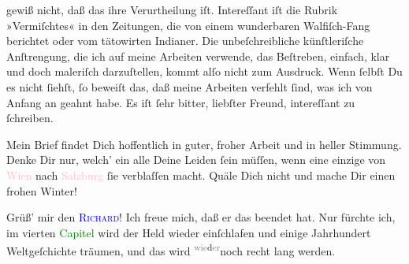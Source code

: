                gewiß nicht, daß das ihre Verurtheilung iſt. Intereſſant iſt die Rubrik »Vermiſchtes«
               in den Zeitungen, die von einem wunderbaren Walfiſch-Fang berichtet oder vom
               tätowirten Indianer. Die unbeſchreibliche künſtleriſche Anſtrengung, die ich auf
               meine Arbeiten verwende, das Beſtreben, einfach, klar und doch maleriſch
               darzuſtellen, {\pb}kommt alſo nicht zum Ausdruck. Wenn
               ſelbſt Du es nicht ſiehſt, ſo beweiſt das, daß meine Arbeiten verfehlt ſind, was ich
               von Anfang an \strikeout{\textcolor{gray}{×}\-\textcolor{gray}{×}\-\textcolor{gray}{×}\-\textcolor{gray}{×}\-\textcolor{gray}{×}\-\textcolor{gray}{×}\-\textcolor{gray}{×}} geahnt habe. Es iſt ſehr bitter, liebſter Freund, intereſſant zu
               ſchreiben.\pend
           
\pstart
           Mein Brief findet Dich hoffentlich in guter, froher Arbeit und in heller Stimmung.
               Denke Dir nur, welch’ ein \label{K_L02858-6v}\label{K_L02858-6h}{ } alle Deine Leiden ſein müſſen, {\pb}wenn eine einzige \label{K_L02858-8v}\label{K_L02858-8h} von \textcolor{pink}{Wien}{}\ledrightnote{\textcolor{pink}{Wien}} nach \textcolor{pink}{Salzburg}{}\ledrightnote{\textcolor{pink}{Salzburg}} ſie verblaſſen macht. Quäle Dich nicht und mache Dir
               einen frohen Winter!\pend
           
\pstart
           Grüß’ mir den \textsc{\textcolor{blue}{Richard}{}\ledrightnote{\textcolor{blue}{Richard Beer-Hofmann}}}! Ich  freue mich, daß er das \label{K_L02858-11v}\label{K_L02858-11h} beendet hat. Nur fürchte
               ich, im vierten \textcolor{green}{Capitel}{}\ledrightnote{{$\rightarrow$}\textcolor{green}{Der Tod Georgs}} wird
               der Held wieder einſchlafen {\pb}und einige Jahrhundert
               Weltgeſchichte  träumen, und das wird \substVorne{}\textsuperscript{\textcolor{gray}{wie}d\textcolor{gray}{er}}{\allowbreak}\substDazwischen{}noch\substHinten{} recht lang werden.\pend
           
